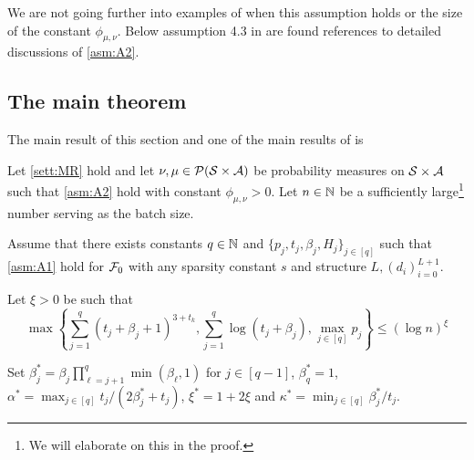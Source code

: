 We are not going further into examples of when this assumption holds
or the size of the constant $\phi_{\mu, \nu}$.
Below assumption 4.3 in  are found references to detailed discussions
of \cref{asm:A2}.

\subsection{The main theorem}

The main result of this section and one of the main results of  is

\begin{thm} \label{thm:main}
  Let \cref{sett:MR} hold and let
  $\nu, \mu \in \mathcal{P}(\mathcal{S} \times \mathcal{A})$ be probability
  measures on $\mathcal{S} \times \mathcal{A}$ such that
  \cref{asm:A2} hold with constant $\phi_{\mu, \nu} > 0$.
  Let $n \in \mathbb{N}$ be a sufficiently
  large\footnote{We will elaborate on this in the proof.}
  number serving as the batch size.
  
  Assume that there exists constants
  $q \in \mathbb{N}$ and $\{p_j, t_j, \beta_j, H_j\}_{j \in [q]}$
  such that \cref{asm:A1} hold for $\mathcal{F}_0$ with
  any sparsity constant $s$ and structure $L, (d_i)_{i=0}^{L+1}$.
  
  Let $\xi > 0$ be such that
  \[ \max \left\{ \sum_{j=1}^q (t_j + \beta_j + 1)^{3 + t_k},
      \sum_{j=1}^q \log (t_j + \beta_j),
      \max_{j \in [q]} p_j
  \right\} \leq (\log n)^\xi \] 

  Set $\beta^*_j = \beta_j \prod_{\ell = j+1}^q \min(\beta_\ell, 1)$
  for $j\in [q-1]$, $\beta^*_q = 1$,
  $\alpha^* = \max_{j \in [q]} t_j/(2\beta^*_j + t_j)$, 
  $\xi^* = 1 + 2\xi$ and $\kappa^* = \min_{j\in [q]} \beta^*_j/t_j$.


\end{thm}
